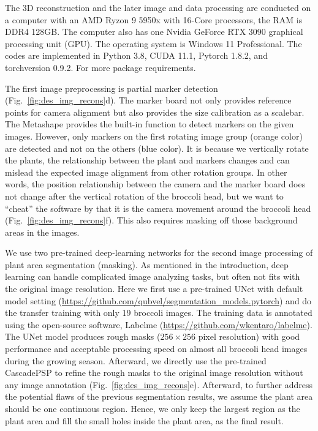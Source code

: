 The 3D reconstruction and the later image and data processing are conducted on a computer with an AMD Ryzon 9 5950x with 16-Core processors, the RAM is DDR4 128GB. The computer also has one Nvidia GeForce RTX 3090 graphical processing unit (GPU). The operating system is Windows 11 Professional. The codes are implemented in Python 3.8, CUDA 11.1, Pytorch 1.8.2, and torchversion 0.9.2. For more package requirements.

The first image preprocessing is partial marker detection (Fig.~\ref{fig:des_img_recons}d). The marker board not only provides reference points for camera alignment but also provides the size calibration as a scalebar. The Metashape provides the built-in function to detect markers on the given images. However, only markers on the first rotating image group (orange color) are detected and not on the others (blue color). It is because we vertically rotate the plants, the relationship between the plant and markers changes and can mislead the expected image alignment from other rotation groups. In other words, the position relationship between the camera and the marker board does not change after the vertical rotation of the broccoli head, but we want to ``cheat'' the software by that it is the camera movement around the broccoli head (Fig.~\ref{fig:des_img_recons}f). This also requires masking off those background areas in the images.

We use two pre-trained deep-learning networks for the second image processing of plant area segmentation (masking). As mentioned in the introduction, deep learning can handle complicated image analyzing tasks, but often not fits with the original image resolution. Here we first use a pre-trained UNet with default model setting (\url{https://github.com/qubvel/segmentation_models.pytorch}) and do the transfer training with only 19 broccoli images. The training data is annotated using the open-source software, Labelme (\url{https://github.com/wkentaro/labelme}). The UNet model produces rough masks ($256 \times 256$ pixel resolution) with good performance and acceptable processing speed on almost all broccoli head images during the growing season. Afterward, we directly use the pre-trained CascadePSP \citep[\url{https://github.com/hkchengrex/CascadePSP}]{cheng_cascadepsp_2020} to refine the rough masks to the original image resolution without any image annotation (Fig.~\ref{fig:des_img_recons}e). Afterward, to further address the potential flaws of the previous segmentation results, we assume the plant area should be one continuous region. Hence, we only keep the largest region as the plant area and fill the small holes inside the plant area, as the final result.


